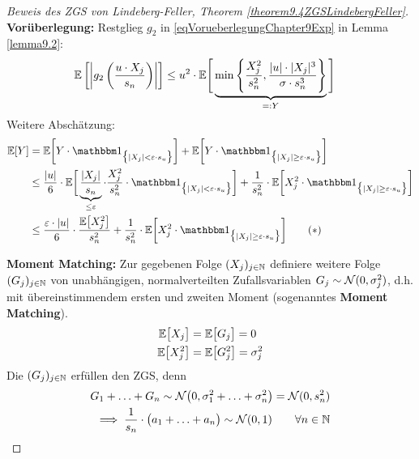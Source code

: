 \begin{proof}[Beweis des ZGS von Lindeberg-Feller, Theorem \ref{theorem9.4ZGSLindebergFeller}]\enter
	\textbf{Vorüberlegung:}
	Restglieg $g_2$ in \eqref{eqVorueberlegungChapter9Exp} in Lemma \ref{lemma9.2}:
	\begin{align*}
		\mathbb{E}\left[\left|g_2\left(\frac{u\cdot X_j}{s_n}\right)\right|\right]
		&\leq u^2\cdot\mathbb{E}\Bigg[\underbrace{\min\left\lbrace\frac{X_j^2}{s_n^2},\frac{|u|\cdot|X_j|^3}{\sigma\cdot s_n^3}\right\rbrace}_{=:Y}\Bigg]
	\end{align*}
	Weitere Abschätzung:
	\begin{align}\nonumber
		\E[Y]&=\E\bigg[Y\cdot\indi_{\big\lbrace|X_j|<\varepsilon\cdot s_u\big\rbrace}\bigg]+
			\E\bigg[Y\cdot\indi_{\big\lbrace|X_j|\geq\varepsilon\cdot s_u\big\rbrace}\bigg]\\\nonumber
			&\leq \frac{|u|}{6}\cdot\E\bigg[\underbrace{\frac{|X_j|}{s_n}}_{\leq\varepsilon}\cdot\frac{X_j^2}{s_n^2}\cdot\indi_{\big\lbrace|X_j|<\varepsilon\cdot s_u\big\rbrace}\bigg]+\frac{1}{s_n^2}\cdot\E\bigg[X_j^2\cdot\indi_{\big\lbrace|X_j|\geq\varepsilon\cdot s_u\big\rbrace}\bigg]\\
			&\leq\frac{\varepsilon\cdot|u|}{6}\cdot\frac{\E\big[X_j^2\big]}{s_n^2}+\frac{1}{s_n^2}\cdot\E\bigg[X_j^2\cdot\indi_{\big\lbrace|X_j|\geq\varepsilon\cdot s_u\big\rbrace}\bigg]\label{eqProof9.4Stern}\tag{$\ast$}
	\end{align}
	
	\textbf{Moment Matching:} Zur gegebenen Folge $(X_j)_{j\in\mathbb{N}}$ definiere weitere Folge $(G_j)_{j\in\mathbb{N}}$ von unabhängigen, normalverteilten Zufallsvariablen $G_j\sim\mathcal{N}(0,\sigma_j^2)$, d.h. mit übereinstimmendem ersten und zweiten Moment (sogenanntes \textbf{Moment Matching}).
	\begin{align*}
		\mathbb{E}\big[X_j\big]&=\mathbb{E}\big[G_j\big]=0\\
		\mathbb{E}\big[X_j^2\big]&=\mathbb{E}\big[G_j^2\big]=\sigma_j^2
	\end{align*}		
	Die $(G_j)_{j\in\mathbb{N}}$ erfüllen den ZGS, denn
	\begin{align*}
		G_1+\ldots+G_n\sim\mathcal{N}\big(0,\sigma_1^2+\ldots+\sigma_n^2\big)=\mathcal{N}(0,s_n^2)\\
		\implies
		\frac{1}{s_n}\cdot\big(a_1+\ldots+a_n\big)\sim\mathcal{N}(0,1)\qquad\forall n\in\mathbb{N}
	\end{align*}


\end{proof}
